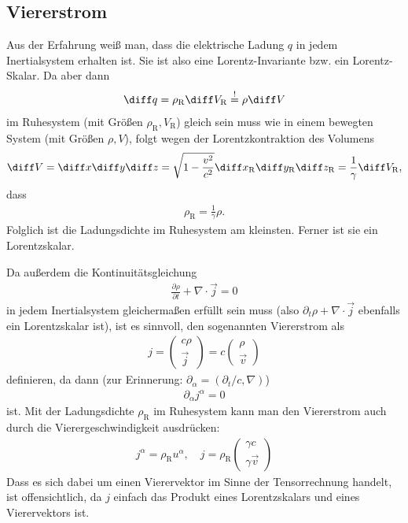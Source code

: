 \subsection{Viererstrom}

Aus der Erfahrung weiß man, dass die elektrische Ladung $q$ in jedem Inertialsystem erhalten ist.
Sie ist also eine Lorentz-Invariante bzw. ein Lorentz-Skalar. Da aber dann
\begin{align*}
    \diff q = \rho_\mathrm{R} \diff V_\mathrm{R} \overset!= \rho \diff V
\end{align*}
im Ruhesystem (mit Größen $\rho_\mathrm{R},V_\mathrm{R}$) gleich sein muss wie in einem bewegten System (mit Größen $\rho,V$),
folgt wegen der Lorentzkontraktion des Volumens
\begin{align*}
    \diff V = \diff x \diff y \diff z = \sqrt{1-\frac{v^2}{c^2}} \diff x_\mathrm{R} \diff y_\mathrm{R} \diff z_\mathrm{R} = \frac{1}{\gamma}\diff V_\mathrm{R},
\end{align*}
dass
\begin{align*}
    \boxed{\rho_\mathrm{R}=\frac{1}{\gamma}\rho.}
\end{align*}
Folglich ist die Ladungsdichte im Ruhesystem am kleinsten. Ferner ist sie ein Lorentzskalar.

Da außerdem die Kontinuitätsgleichung
\begin{align*}
    \frac{\partial\rho}{\partial t}+\nabla \cdot\vec j=0
\end{align*}
in jedem Inertialsystem gleichermaßen erfüllt sein muss (also $\partial_t \rho+\nabla\cdot\vec j$ ebenfalls ein Lorentzskalar ist),
ist es sinnvoll, den sogenannten Viererstrom als
\begin{align*}
    j=\begin{pmatrix} c\rho\\\vec j\end{pmatrix}=c\begin{pmatrix} \rho\\\vec v\end{pmatrix}
\end{align*}
definieren, da dann (zur Erinnerung: $\partial_\alpha=(\partial_t/c,\nabla)$)
\begin{align*}
    \partial_\alpha j^\alpha = 0
\end{align*}
ist. Mit der Ladungsdichte $\rho_\mathrm{R}$ im Ruhesystem kann man den Viererstrom auch durch die Vierergeschwindigkeit ausdrücken:
\begin{align*}
    j^\alpha=\rho_\mathrm{R} u^\alpha, \quad j=\rho_\mathrm{R} \begin{pmatrix} \gamma c\\\gamma\vec v\end{pmatrix}
\end{align*}
Dass es sich dabei um einen Vierervektor im Sinne der Tensorrechnung handelt, ist offensichtlich, da $j$ einfach das Produkt eines Lorentzskalars und eines Vierervektors ist.



